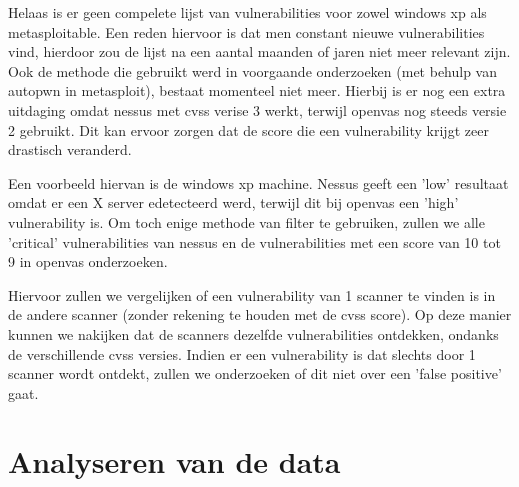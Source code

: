 Helaas is er geen compelete lijst van vulnerabilities voor zowel windows xp als metasploitable. Een reden hiervoor is dat men constant nieuwe vulnerabilities vind, hierdoor zou de lijst na een aantal maanden of jaren niet meer relevant zijn. Ook de methode die gebruikt werd in voorgaande onderzoeken (met behulp van autopwn in metasploit), bestaat momenteel niet meer. Hierbij is er nog een extra uitdaging omdat nessus met cvss verise 3 werkt, terwijl openvas nog steeds versie 2 gebruikt. Dit kan ervoor zorgen dat de score die een vulnerability krijgt zeer drastisch veranderd. 

Een voorbeeld hiervan is de windows xp machine. Nessus geeft een 'low' resultaat omdat er een X server edetecteerd werd, terwijl dit bij openvas een 'high' vulnerability is. Om toch enige methode van filter te gebruiken, zullen we alle 'critical' vulnerabilities van nessus en de vulnerabilities met een score van 10 tot 9 in openvas onderzoeken. 

Hiervoor zullen we vergelijken of een vulnerability van 1 scanner te vinden is in de andere scanner (zonder rekening te houden met de cvss score). Op deze manier kunnen we nakijken dat de scanners dezelfde vulnerabilities ontdekken, ondanks de verschillende cvss versies. Indien er een vulnerability is dat slechts door 1 scanner wordt ontdekt, zullen we onderzoeken of dit niet over een 'false positive' gaat.


\section{Analyseren van de data}


